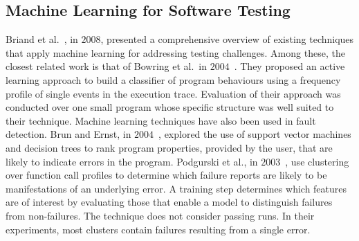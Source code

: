 \subsection{Machine Learning for Software Testing}
Briand et al.~\cite{briand2008novel}, in $2008$, presented a comprehensive overview of existing techniques that apply machine learning for addressing testing challenges.
Among these, the closest related work is that of
Bowring et al.\ in $2004$~\cite{bowring2004active}. They proposed an active learning approach to
build a classifier of program behaviours using a frequency profile of single events in the
execution trace. %
Evaluation of their approach was conducted over one small program whose specific structure was well suited to their technique. 
Machine learning techniques have also been used in fault detection. 
Brun and Ernst, in $2004$~\cite{brun04finding}, explored the use of support vector machines and decision trees to rank program properties, provided by the user,  that are likely to indicate 
errors in the program. Podgurski et al., in $2003$~\cite{podgurski2003automated},
use clustering
over function call profiles to determine which failure reports
are likely to be manifestations of an underlying error. A training step determines which features are of interest
by evaluating those that enable a model to distinguish
failures from non-failures. The technique does not
consider passing runs. In their experiments, most
clusters contain failures resulting from
a single error.

